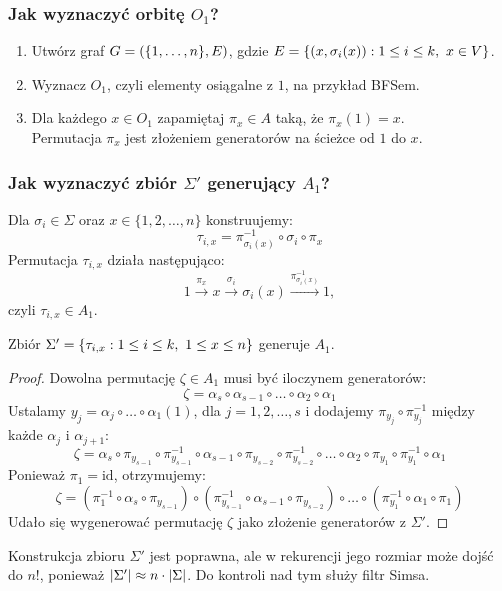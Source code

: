 \newpage
\subsubsection*{Jak wyznaczyć orbitę \(O_1\)?}
\begin{greyframe}
    \begin{enumerate}
        \item Utwórz graf \( G=(\set{1, \ldots, n}, E) \), gdzie \( E = \set{(x, \sigma_i(x)) : 1 \leq i \leq k, \ x \in V } \).
        \item Wyznacz \( O_1 \), czyli elementy osiągalne z \( 1 \), na przykład BFSem.
        \item Dla każdego \( x \in O_1 \) zapamiętaj \( \pi_x \in A \) taką, że \( \pi_x(1) = x \). \\
        Permutacja \(\pi_x\) jest złożeniem generatorów na ścieżce od \( 1 \) do \( x \).
    \end{enumerate}
\end{greyframe}

\subsubsection*{Jak wyznaczyć zbiór \(\Sigma'\) generujący \(A_1\)?}
Dla \(\sigma_i \in \Sigma\) oraz \(x \in \{1, 2, \ldots, n\}\) konstruujemy:
\[
    \tau_{i,x} = \pi_{\sigma_i(x)}^{-1} \circ \sigma_i \circ \pi_x
\]
Permutacja \(\tau_{i,x}\) działa następująco:
\[
    1 \xrightarrow{\pi_x} x \xrightarrow{\sigma_i} \sigma_i(x) \xrightarrow{\pi_{\sigma_i(x)}^{-1}} 1,
\]
czyli \(\tau_{i,x} \in A_1\).

\begin{lemma}[Schreiera]
    Zbiór \( \Sigma' = \set{\tau_{i,x} : 1 \leq i \leq k, \ 1 \leq x \leq n} \) generuje \( A_1 \).
\end{lemma}
\begin{proof}
    Dowolna permutację \(\zeta \in A_1\) musi być iloczynem generatorów:
    \[
        \zeta = \alpha_s \circ \alpha_{s-1} \circ \ldots \circ \alpha_2 \circ \alpha_1
    \]
    Ustalamy \(y_j = \alpha_j \circ \ldots \circ \alpha_1(1)\), dla \(j = 1, 2, \ldots, s\) i dodajemy \(\pi_{y_j} \circ \pi_{y_j}^{-1}\) między każde \(\alpha_j\) i \(\alpha_{j+1}\):
    \[
        \zeta = \alpha_s \circ \pi_{y_{s-1}} \circ \pi_{y_{s-1}}^{-1} \circ \alpha_{s-1} \circ \pi_{y_{s-2}} \circ \pi_{y_{s-2}}^{-1} \circ \ldots \circ \alpha_2 \circ \pi_{y_1} \circ \pi_{y_1}^{-1} \circ \alpha_1
    \]
    Ponieważ \(\pi_1 = \text{id}\), otrzymujemy:
    \[
        \zeta = (\pi_1^{-1} \circ \alpha_s \circ \pi_{y_{s-1}}) \circ (\pi_{y_{s-1}}^{-1} \circ \alpha_{s-1} \circ \pi_{y_{s-2}}) \circ \ldots \circ (\pi_{y_1}^{-1} \circ \alpha_1 \circ \pi_1)
    \]
    Udało się wygenerować permutację \(\zeta\) jako złożenie generatorów z \(\Sigma'\).
\end{proof}
Konstrukcja zbioru \( \Sigma' \) jest poprawna, ale w rekurencji jego rozmiar może dojść do \( n! \), ponieważ \( \left\lvert\Sigma'\right\rvert \approx n \cdot \left\lvert\Sigma\right\rvert \).
Do kontroli nad tym służy filtr Simsa.

